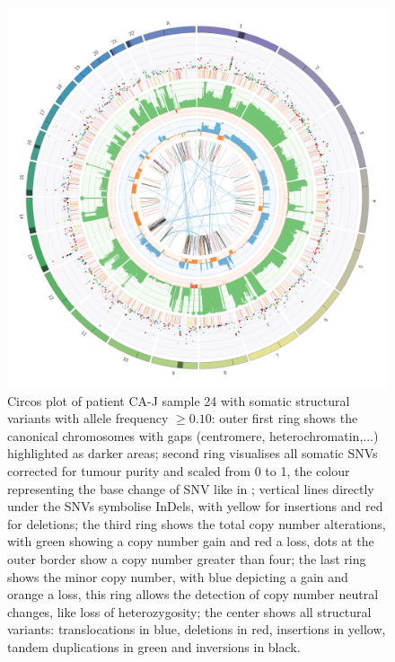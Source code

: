 \begin{figure}[ht]
\centering
\includegraphics[width=.99\linewidth]{Figures/CASCADE/CA80/CA80-24.circos.png}
\caption[Circos plot of patient CA-J sample 24]{Circos plot of patient CA-J sample 24 with somatic structural variants with allele frequency $\geq 0.10$: outer first ring shows the canonical chromosomes with gaps (centromere, heterochromatin,...) highlighted as darker areas; second ring visualises all somatic SNVs corrected for tumour purity and scaled from 0 to 1, the colour representing the base change of SNV like in \protect\textcite{Alexandrov2013}; vertical lines directly under the SNVs symbolise InDels, with yellow for insertions and red for deletions; the third ring shows the total copy number alterations, with green showing a copy number gain and red a loss, dots at the outer border show a copy number greater than four; the last ring shows the minor copy number, with blue depicting a gain and orange a loss, this ring allows the detection of copy number neutral changes, like loss of heterozygosity; the center shows all structural variants: translocations in blue, deletions in red, insertions in yellow, tandem duplications in green and inversions in black.} \label{fig:ca80.24circos}
\end{figure}

